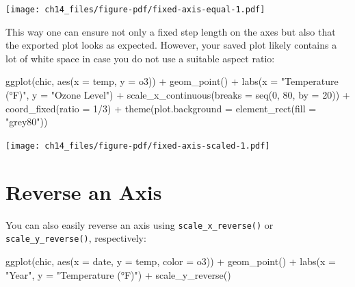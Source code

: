 \documentclass[
  letterpaper,
]{scrbook}
\newenvironment{Shaded}{\begin{snugshade}}{\end{snugshade}}
\newcommand{\AttributeTok}[1]{\textcolor[rgb]{0.40,0.45,0.13}{#1}}
\newcommand{\DecValTok}[1]{\textcolor[rgb]{0.68,0.00,0.00}{#1}}
\newcommand{\FunctionTok}[1]{\textcolor[rgb]{0.28,0.35,0.67}{#1}}
\newcommand{\NormalTok}[1]{\textcolor[rgb]{0.00,0.23,0.31}{#1}}
\newcommand{\SpecialCharTok}[1]{\textcolor[rgb]{0.37,0.37,0.37}{#1}}
\newcommand{\StringTok}[1]{\textcolor[rgb]{0.13,0.47,0.30}{#1}}
\begin{document}
\texttt{[image: ch14\_files/figure-pdf/fixed-axis-equal-1.pdf]}

This way one can ensure not only a fixed step length on the axes but
also that the exported plot looks as expected. However, your saved plot
likely contains a lot of white space in case you do not use a suitable
aspect ratio:

\begin{Shaded}
\begin{Highlighting}[]
\FunctionTok{ggplot}\NormalTok{(chic, }\FunctionTok{aes}\NormalTok{(}\AttributeTok{x =}\NormalTok{ temp, }\AttributeTok{y =}\NormalTok{ o3)) }\SpecialCharTok{+}
  \FunctionTok{geom\_point}\NormalTok{() }\SpecialCharTok{+}
  \FunctionTok{labs}\NormalTok{(}\AttributeTok{x =} \StringTok{"Temperature (°F)"}\NormalTok{, }\AttributeTok{y =} \StringTok{"Ozone Level"}\NormalTok{) }\SpecialCharTok{+}
  \FunctionTok{scale\_x\_continuous}\NormalTok{(}\AttributeTok{breaks =} \FunctionTok{seq}\NormalTok{(}\DecValTok{0}\NormalTok{, }\DecValTok{80}\NormalTok{, }\AttributeTok{by =} \DecValTok{20}\NormalTok{)) }\SpecialCharTok{+}
  \FunctionTok{coord\_fixed}\NormalTok{(}\AttributeTok{ratio =} \DecValTok{1}\SpecialCharTok{/}\DecValTok{3}\NormalTok{) }\SpecialCharTok{+}
  \FunctionTok{theme}\NormalTok{(}\AttributeTok{plot.background =} \FunctionTok{element\_rect}\NormalTok{(}\AttributeTok{fill =} \StringTok{"grey80"}\NormalTok{))}
\end{Highlighting}
\end{Shaded}

\texttt{[image: ch14\_files/figure-pdf/fixed-axis-scaled-1.pdf]}

\section{Reverse an Axis}\label{reverse-an-axis}

You can also easily reverse an axis using \texttt{scale\_x\_reverse()}
or \texttt{scale\_y\_reverse()}, respectively:

\begin{Shaded}
\begin{Highlighting}[]
\FunctionTok{ggplot}\NormalTok{(chic, }\FunctionTok{aes}\NormalTok{(}\AttributeTok{x =}\NormalTok{ date, }\AttributeTok{y =}\NormalTok{ temp, }\AttributeTok{color =}\NormalTok{ o3)) }\SpecialCharTok{+}
  \FunctionTok{geom\_point}\NormalTok{() }\SpecialCharTok{+}
  \FunctionTok{labs}\NormalTok{(}\AttributeTok{x =} \StringTok{"Year"}\NormalTok{, }\AttributeTok{y =} \StringTok{"Temperature (°F)"}\NormalTok{) }\SpecialCharTok{+}
  \FunctionTok{scale\_y\_reverse}\NormalTok{()}
\end{Highlighting}
\end{Shaded}
\end{document}
